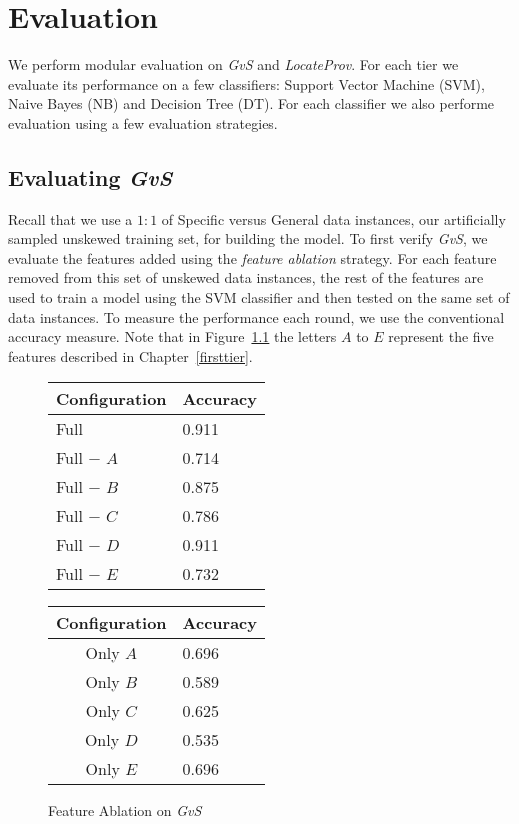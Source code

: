 \chapter{Evaluation}
\label{evaluation}
We perform modular evaluation on \textit{GvS} and \textit{LocateProv}. For each tier we evaluate its performance on a few classifiers: Support Vector Machine (SVM), Naive Bayes (NB) and Decision Tree (DT). For each classifier we also performe evaluation using a few evaluation strategies.

\section{Evaluating {\it GvS}}
\label{eval:first}
Recall that we use a $1:1$ of Specific versus General data instances, our artificially sampled unskewed training set, for building the model. To first verify {\it GvS}, we evaluate the features added using the \textit{feature ablation} strategy. For each feature removed from this set of unskewed data instances, the rest of the features are used to train a model using the SVM classifier and then tested on the same set of data instances. To measure the performance each round, we use the conventional accuracy measure. Note that in Figure~\ref{fig:ablation_first} the letters $A$ to $E$ represent the five features described in Chapter~\ref{firsttier}.

\begin{figure}[ht]
\begin{minipage}[b]{0.45\linewidth}\centering
\begin{tabular}{ l | l }
Configuration & Accuracy \\
\hline
Full			& 0.911 \\
Full $-$ $A$	& 0.714 \\
Full $-$ $B$	& 0.875 \\
Full $-$ $C$	& 0.786 \\
Full $-$ $D$	& 0.911 \\
Full $-$ $E$	& 0.732 \\
\end{tabular}
\end{minipage}
\hspace{0.5cm}
\begin{minipage}[b]{0.45\linewidth}\centering
\begin{tabular}{ c | l }
Configuration & Accuracy \\
\hline
Only $A$	& 0.696 \\
Only $B$	& 0.589 \\
Only $C$	& 0.625 \\
Only $D$	& 0.535 \\
Only $E$	& 0.696 \\
\end{tabular}
\end{minipage}
\caption{Feature Ablation on {\it GvS}}
\label{fig:ablation_first}
\end{figure}

